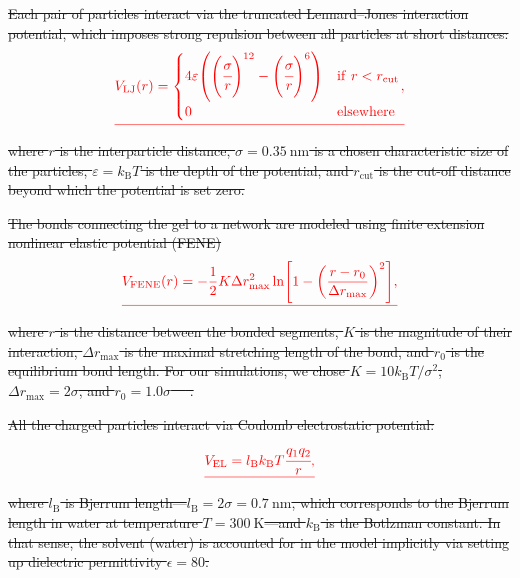 \documentclass[gels,article,accept,pdftex,moreauthors]{Definitions/mdpi}
\newcommand{\kT}{k_\mathrm{B}T}
\newcommand{\kB}{k_\mathrm{B}}
\newcommand{\lb}{l_\mathrm{B}}
\providecommand{\DIFdel}[1]{{\protect\color{red}\sout{#1}}}                      %
\begin{document}
\DIFdel{Each pair of particles interact via the truncated Lennard--Jones interaction potential, which imposes strong repulsion between all particles at short distances:
}\begin{displaymath}
    \DIFdel{\begin{split}%
        V_\mathrm{LJ}(r) =
        \begin{cases}
            4 \varepsilon \left( \left(\cfrac{\sigma}{r}\right)^{12}
            - \left(\cfrac{\sigma}{r}\right)^6\right)
            & \mathrm{if~} r < r_\mathrm{cut}\\
            0
            & \mathrm{elsewhere}
        \end{cases},
    \end{split}
}\end{displaymath}%
\DIFdel{where 
$r$ is the interparticle distance, 
$\sigma = 0.35~\mathrm{nm}$ is a chosen characteristic size of the particles, 
$\varepsilon = \kT$ is the depth of the potential, and 
$r_\mathrm{cut}$ is the cut-off distance beyond which the potential is set zero.
}%

\DIFdel{The bonds connecting the gel to a network are modeled using finite extension nonlinear elastic potential (FENE)
}\begin{displaymath}\DIFdel{%
V_\mathrm{FENE}(r) = -\frac{1}{2} K \Delta r_\mathrm{max}^2\ln \left[ 1 - \left(\frac{r-r_0}{\Delta r_\mathrm{max}} \right)^2 \right ],
}\end{displaymath}%
\DIFdel{where
$r$ is the distance between the bonded segments,
$K$ is the magnitude of their interaction,
$\Delta r_{\mathrm{max}}$ is the maximal stretching length of the bond, and
$r_0$ is the equilibrium bond length.
For our simulations, we chose $K = 10 \kT/\sigma^{2}$, $\Delta r_{\mathrm{max}} = 2 \sigma$, and $r_0 = 1.0\sigma$~\mbox{%
\cite{Jin2007}}\hspace{0pt}%
.
}%

\DIFdel{All the charged particles interact via Coulomb electrostatic potential:
}\begin{displaymath}
    \DIFdel{V_{\mathrm{EL}}=\lb\kT \cfrac{q_{1}q_{2}}{r},
}\end{displaymath}%
\DIFdel{where $\lb$ is Bjerrum length---$\lb = 2\sigma = 0.7~\mathrm{nm}$, which corresponds to the  Bjerrum length in water at temperature $T=300~\mathrm{K}$---and $\kB$ is the Botlzman constant.
In that sense, the solvent (water) is accounted for in the model implicitly via setting up dielectric permittivity $\epsilon=80$.
}%
\end{document}
